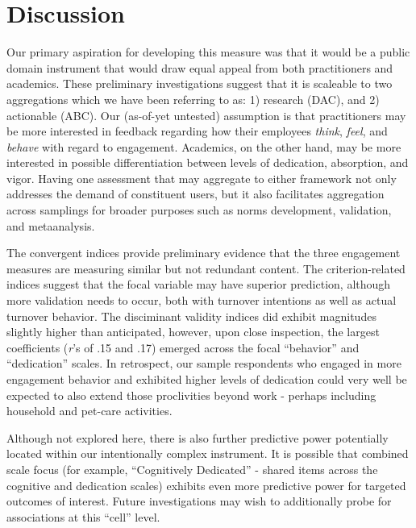 \documentclass[
  man]{apa6}
\begin{document}
\hypertarget{discussion}{%
\section{Discussion}\label{discussion}}

Our primary aspiration for developing this measure was that it would be a public domain instrument that would draw equal appeal from both practitioners and academics. These preliminary investigations suggest that it is scaleable to two aggregations which we have been referring to as: 1) research (DAC), and 2) actionable (ABC). Our (as-of-yet untested) assumption is that practitioners may be more interested in feedback regarding how their employees \emph{think}, \emph{feel}, and \emph{behave} with regard to engagement. Academics, on the other hand, may be more interested in possible differentiation between levels of dedication, absorption, and vigor. Having one assessment that may aggregate to either framework not only addresses the demand of constituent users, but it also facilitates aggregation across samplings for broader purposes such as norms development, validation, and metaanalysis.

The convergent indices provide preliminary evidence that the three engagement measures are measuring similar but not redundant content. The criterion-related indices suggest that the focal variable may have superior prediction, although more validation needs to occur, both with turnover intentions as well as actual turnover behavior. The disciminant validity indices did exhibit magnitudes slightly higher than anticipated, however, upon close inspection, the largest coefficients (\emph{r}'s of .15 and .17) emerged across the focal ``behavior'' and ``dedication'' scales. In retrospect, our sample respondents who engaged in more engagement behavior and exhibited higher levels of dedication could very well be expected to also extend those proclivities beyond work - perhaps including household and pet-care activities.

Although not explored here, there is also further predictive power potentially located within our intentionally complex instrument. It is possible that combined scale focus (for example, ``Cognitively Dedicated'' - shared items across the cognitive and dedication scales) exhibits even more predictive power for targeted outcomes of interest. Future investigations may wish to additionally probe for associations at this ``cell'' level.

\newpage
\end{document}
